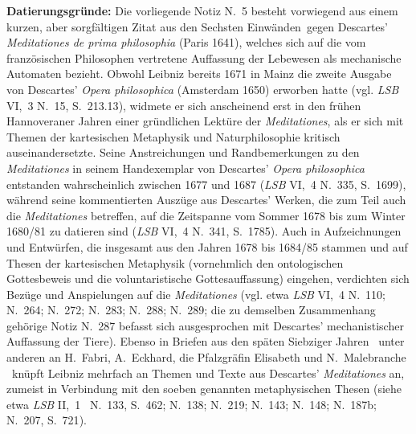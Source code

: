 \begin{ledgroup}%
\footnotesize%
\pstart%
\noindent%
\textbf{Datierungsgründe:}
Die vorliegende Notiz N.~5 besteht vorwiegend aus einem kurzen, aber sorgfältigen Zitat aus den \glqq Sechsten Einwänden\grqq\ gegen Descartes'%
\protect{}
\textit{Meditationes de prima philosophia}\cite{01999} (Paris 1641), welches sich auf die vom französischen Philosophen vertretene Auffassung der Lebewesen als mechanische Automaten bezieht. %
Obwohl Leibniz bereits 1671 in Mainz\protect{} die zweite Ausgabe von Descartes' \textit{Opera philosophica}\cite{01300} (Amsterdam 1650) erworben hatte (vgl. \textit{LSB} VI,~3 N.~15, S.~213.13\cite{01302}), widmete er sich anscheinend erst in den frühen Hannoveraner\protect{} Jahren einer gründlichen Lektüre der \textit{Meditationes}\cite{01999}, als er sich mit Themen der kartesischen Metaphysik und Naturphilosophie kritisch auseinandersetzte.
Seine Anstreichungen und Randbemerkungen zu den \textit{Meditationes}\cite{01999} in seinem Handexemplar von Descartes' \textit{Opera philosophica}\cite{01300} entstanden wahrscheinlich zwischen 1677 und 1687 (\textit{LSB} VI,~4 N.~335, S.~1699\cite{01301}), während seine kommentierten Auszüge aus Descartes' Werken, die zum Teil auch die \textit{Meditationes}\cite{01999} betreffen, auf die Zeitspanne vom Sommer 1678 bis zum Winter 1680/81 zu datieren sind (\textit{LSB} VI,~4 N.~341, S.~1785\cite{01303}).
Auch in Aufzeichnungen und Entwürfen, die insgesamt aus den Jahren 1678 bis 1684/85 stammen und auf Thesen der kartesischen Metaphysik (vornehmlich den ontologischen Gottesbeweis und die voluntaristische Gottesauffassung) eingehen, verdichten sich Bezüge und Anspielungen auf die \textit{Meditationes}\cite{01999} (vgl. etwa \textit{LSB} VI,~4 N.~110\cite{01304}; N.~264\cite{01305}; N.~272\cite{01308}; N.~283\cite{01306}; N.~288;\cite{01317} N.~289\cite{01307}; die zu demselben Zusammenhang gehörige Notiz N.~287\cite{01318} befasst sich ausgesprochen mit Descartes' mechanistischer Auffassung der Tiere).
Ebenso in Briefen aus den späten Siebziger Jahren \textendash\ unter anderen an H.~Fabri, A.~Eckhard, die Pfalzgräfin Elisabeth und N.~Malebranche \textendash\ knüpft Leibniz mehrfach an Themen und Texte aus Descartes' \textit{Meditationes}\cite{01999} an, zumeist in Verbindung mit den soeben genannten metaphysischen Thesen (siehe etwa \textit{LSB} II,~1 \rbrack\ N.~133, S.~462;\cite{01309} N.~138;\cite{01310} N.~219;\cite{01311} N.~143;\cite{01312} N.~148;\cite{01313} N.~187b;\cite{01314} N.~207, S.~721\cite{01315}).

\end{ledgroup}
